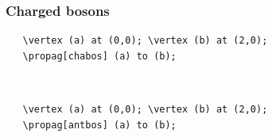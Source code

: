 \documentclass[10pt,letterpaper,twoside,notitlepage]{article}
\numberwithin{figure}{section}
\begin{document}
\subsubsection*{Charged bosons}
%
\begin{minipage}{0.7\linewidth}
\vercol\begin{verbatim}
   \vertex (a) at (0,0); \vertex (b) at (2,0);
   \propag[chabos] (a) to (b);
\end{verbatim}\txcol
\end{minipage}
%
\begin{minipage}{0.25\linewidth}
\end{minipage}
\\
%
\begin{minipage}{0.7\linewidth}
\vercol\begin{verbatim}
   \vertex (a) at (0,0); \vertex (b) at (2,0);
   \propag[antbos] (a) to (b);
\end{verbatim}\txcol
\end{minipage}
%
\begin{minipage}{0.25\linewidth}
\end{minipage}
\\
%
\newpage
\end{document}
